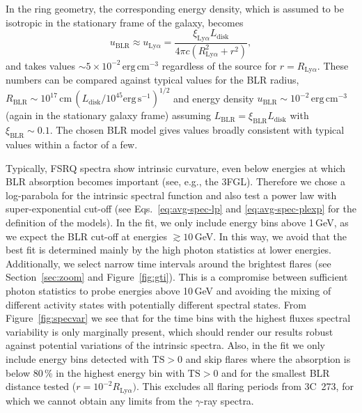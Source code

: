 \documentclass[twocolumn]{aastex62}
\newcommand{\gray}{$\gamma$-ray\xspace}
\begin{document}
In the ring geometry, the corresponding energy density, which is assumed to be isotropic in the stationary frame of the galaxy, becomes~\citep{finke2016}
    \begin{equation}
        u_\mathrm{BLR} \approx u_{\mathrm{Ly}\alpha}= \frac{\xi_{\mathrm{Ly}\alpha}L_\mathrm{disk}}{4\pi c(R_{\mathrm{Ly}\alpha}^2 + r^2)},
        \label{eq:u-blr}
    \end{equation}
and takes values $\sim 5\times10^{-2}\,\mathrm{erg}\,\mathrm{cm}^{-3}$ regardless of the source for $r = R_{\mathrm{Ly}\alpha}$.
These numbers can be compared against typical values for the BLR radius, $R_\mathrm{BLR} \sim 10^{17}\,\mathrm{cm}\, (L_\mathrm{disk} / 10^{45} \mathrm{erg}\,\mathrm{s}^{-1})^{1/2}$ \citep[e.g.][]{2007ApJ...659..997K,2009ApJ...697..160B} and energy density $u_\mathrm{BLR} \sim 10^{-2}\,\mathrm{erg}\,\mathrm{cm}^{-3} $ (again in the stationary galaxy frame) assuming  $L_\mathrm{BLR} = \xi_\mathrm{BLR} L_\mathrm{disk}$ with $\xi_\mathrm{BLR}\sim 0.1$. 
The chosen BLR model gives values broadly consistent with typical values within a factor of a few.

Typically, FSRQ spectra show intrinsic curvature, even below energies at which BLR absorption becomes important (see, e.g., the 3FGL). Therefore we chose a log-parabola for the intrinsic spectral function and also test a power law with super-exponential cut-off (see Eqs.~\ref{eq:avg-spec-lp} and \ref{eq:avg-spec-plexp} for the definition of the models). 
In the fit, we only include energy bins above 1\,GeV, as we expect the BLR cut-off at energies $\gtrsim 10\,$GeV. In this way, we avoid that the best fit is determined mainly by the high photon statistics at lower energies.
Additionally, we select narrow time intervals around the brightest flares (see Section~\ref{sec:zoom} and Figure~\ref{fig:gti}).
This is a compromise between sufficient photon statistics to probe energies above 10\,GeV and avoiding the mixing of different activity states with potentially different spectral states. 
From Figure~\ref{fig:specvar} we see that for the time bins with the highest fluxes spectral variability is only marginally present, which should render our results robust against potential variations of the intrinsic spectra. 
Also, in the fit we only include energy bins detected with $\mathrm{TS} > 0$ and skip flares where the absorption is below 80\,\% in the highest energy bin with $\mathrm{TS} > 0$ and for the smallest BLR distance tested ($r = 10^{-2}R_{\mathrm{Ly}\alpha})$. 
This excludes all flaring periods from 3C~273, for which we cannot obtain any limits from the \gray spectra.
\end{document}
